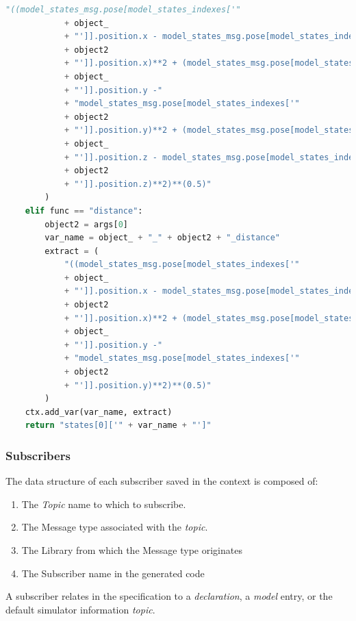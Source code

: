 \begin{lstlisting}[language=Python]
            "((model_states_msg.pose[model_states_indexes['"
            + object_
            + "']].position.x - model_states_msg.pose[model_states_indexes['"
            + object2
            + "']].position.x)**2 + (model_states_msg.pose[model_states_indexes['"
            + object_
            + "']].position.y -"
            + "model_states_msg.pose[model_states_indexes['"
            + object2
            + "']].position.y)**2 + (model_states_msg.pose[model_states_indexes['"
            + object_
            + "']].position.z - model_states_msg.pose[model_states_indexes['"
            + object2
            + "']].position.z)**2)**(0.5)"
        )
    elif func == "distance":
        object2 = args[0]
        var_name = object_ + "_" + object2 + "_distance"
        extract = (
            "((model_states_msg.pose[model_states_indexes['"
            + object_
            + "']].position.x - model_states_msg.pose[model_states_indexes['"
            + object2
            + "']].position.x)**2 + (model_states_msg.pose[model_states_indexes['"
            + object_
            + "']].position.y -"
            + "model_states_msg.pose[model_states_indexes['"
            + object2
            + "']].position.y)**2)**(0.5)"
        )
    ctx.add_var(var_name, extract)
    return "states[0]['" + var_name + "']"
\end{lstlisting}


\subsubsection{Subscribers}
\label{sssec:compileSubs}

The data structure of each subscriber saved in the context is composed of:

\begin{enumerate}
    \item The \textit{Topic} name to which to subscribe.
    \item The Message type associated with the \textit{topic}.
    \item The Library from which the Message type originates
    \item The Subscriber name in the generated code
\end{enumerate}

A subscriber relates in the specification to a \textit{declaration}, a \textit{model} entry, or the default simulator information \textit{topic}.

